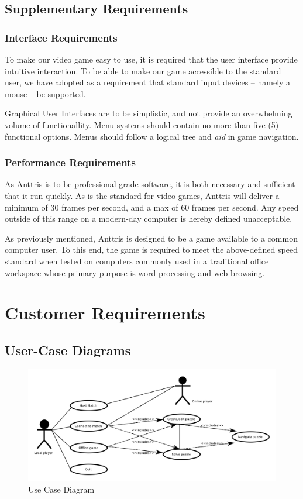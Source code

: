 \documentclass[12pt]{article}
\begin{document}
\subsection{Supplementary Requirements}\label{supplementary-reqs-SM}
\subsubsection{Interface Requirements}
To make our video game easy to use, it is required that the user interface
provide intuitive interaction. To be able to make our game accessible to
the standard user, we have adopted as a requirement that standard
input devices -- namely a mouse -- be supported.

Graphical User Interfaces are to be simplistic, and not provide an overwhelming
volume of functionallity. Menu systems should contain no more than five (5)
functional options. Menus should follow a logical tree and \textsl{aid} in
game navigation.
\subsubsection{Performance Requirements}
As Anttris is to be professional-grade software, it is both necessary and
sufficient that it run quickly. As is the standard for video-games, Anttris
will deliver a minimum of 30 frames per second, and a max of 60 frames per
second. Any speed outside of this range on a modern-day computer is hereby
defined unacceptable.

As previously mentioned, Anttris is designed to be a game available to a common
computer user. To this end, the game is required to meet the above-defined
speed standard when tested on computers commonly used in a traditional office
workspace whose primary purpose is word-processing and web browsing.

\section{Customer Requirements}\label{cust-reqs-HR}
\subsection{User-Case Diagrams}
    \begin{figure}[H]
        \centering
        \includegraphics[width=6in]{use_cases.png}
        \caption{Use Case Diagram}
    \end{figure}
\end{document}
